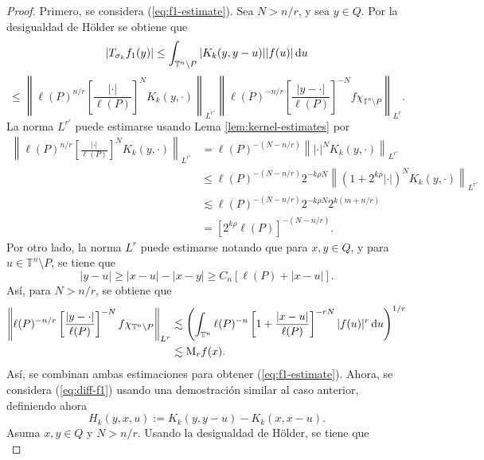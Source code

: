 \begin{proof}
	Primero, se considera (\ref{eq:f1-estimate}). Sea $N>n/r$, y sea $y\in Q$. Por la desigualdad de H\"older se obtiene que
	\begin{equation*}
		|T_{\sigma_k}f_1(y)| \leq \int_{\mathbb{T}^n\setminus P} |K_k(y, y-u)||f(u)|\mathop{}\!\mathrm{d} u 
	\end{equation*}
	\begin{equation*}
		\leq \left\| \ell(P)^{n/r} \left[ \frac{|\cdot|}{\ell(P)} \right]^N K_k(y, \cdot) 
		\right\|_{L^{r'}} \left\| \ell(P)^{-n/r} \left[ \frac{|y-\cdot|}{\ell(P)} \right]^{-N} f\chi_{\mathbb{T}^n\setminus P} 
		\right\|_{L^r}.
	\end{equation*}
	La norma $L^{r'}$ puede estimarse usando Lema \ref{lem:kernel-estimates} por 
	\begin{align*}
		\left\| \ell(P)^{n/r} \left[ \frac{|\cdot|}{\ell(P)} \right]^N K_k(y, \cdot) 
		\right\|_{L^{r'}} & = \ell(P)^{-(N-n/r)} \left\| |\cdot|^N K_k(y, \cdot)  \right\|_{L^{r'}} \\
		& \leq \ell(P)^{-(N-n/r)} 2^{-k\rho N} \left\| (1+2^{k\rho} |\cdot|)^N K_k(y, \cdot)  \right\|_{L^{r'}} \\
		& \lesssim \ell(P)^{-(N-n/r)} 2^{-k\rho N} 2^{k(m+n/r)}\\
		& = [2^{k\rho}\ell(P)]^{-(N-n/r)}.
	\end{align*}
	Por otro lado, la norma $L^r$ puede estimarse notando que para $x, y \in Q$, y para $u \in \mathbb{T}^n\setminus P$, se tiene que
	\begin{equation*}
		|y-u|\geq |x-u|-|x-y| \geq C_n[\ell(P)+|x-u|].
	\end{equation*}
	Así, para $N>n/r$, se obtiene que
\begin{align*}
	\left\| \ell(P)^{-n/r} \left[ \frac{|y-\cdot|}{\ell(P)} \right]^{-N}f \chi_{\mathbb{T}^n\setminus P}
	\right\|_{L^r}& \lesssim\left( \int_{\mathbb{T}^n} \ell(P)^{-n} \left[ 1+\frac{|x-u|}{\ell(P)}
	\right]^{-rN} |f(u)|^r \mathop{}\!\mathrm{d} u
	\right)^{1/r} \\
	& \lesssim\mathrm{M}_rf(x).
\end{align*}
Así, se combinan ambas estimaciones para obtener (\ref{eq:f1-estimate}). Ahora, se considera (\ref{eq:diff-f1}) usando una demostración similar al caso anterior, definiendo ahora 
\begin{equation*}
	H_k(y, x, u) := K_k(y, y-u) - K_k(x, x-u).
\end{equation*}
Asuma $x, y \in Q$ y $N>n/r$. Usando la desigualdad de H\"older, se tiene que
\begin{equation*}

\end{equation*}
\end{proof}
